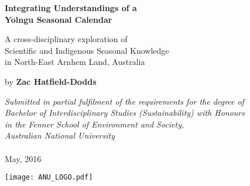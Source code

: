 \renewcommand*{\maketitle}{%
\begin{titlepage}
    \begin{center}
        \vspace*{1cm}

        \Huge
        \textbf{Integrating Understandings of a\\
        Yolngu Seasonal Calendar}

        \vspace{1cm}
        \Large
        A cross-disciplinary exploration of\\
        Scientific and Indigenous Seasonal Knowledge\\
        in North-East Arnhem Land, Australia

        \vspace{1.5cm}

        by \textbf{Zac Hatfield-Dodds}

        \vfill

        \large \textit{
        Submitted in partial fulfilment of the requirements for the degree of\\
        Bachelor of Interdisciplinary Studies (Sustainability) with Honours\\
        in the Fenner School of Environment and Society,\\
        Australian National University\\
        }~\\
        May, 2016

        \vspace{1.5cm}

        \texttt{[image: ANU\_LOGO.pdf]}

    \end{center}
\end{titlepage}
}

\maketitle
